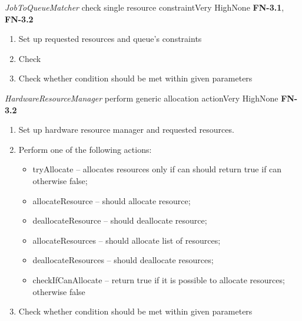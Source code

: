 \begin{testcase}{\emph{JobToQueueMatcher} check single resource constraint}{Very High}{None}
	{
		\textbf{FN-3.1}, \textbf{FN-3.2}
	}
	{
		\begin{enumerate}
			\item Set up requested resources and queue's constraints
			\item Check 
			\item Check whether condition should be met within given parameters
		\end{enumerate}
	}
\end{testcase}


\begin{testcase}{\emph{HardwareResourceManager} perform generic allocation action}{Very High}{None}
	{
		\textbf{FN-3.2}
	}
	{
		\begin{enumerate}
			\item Set up hardware resource manager and requested resources.
			\item
			{
				Perform one of the following actions: 
				\begin{itemize}
					\item tryAllocate -- allocates resources only if can should return true if can otherwise false;
					\item allocateResource -- should allocate resource;
					\item deallocateResource -- should deallocate resource;
					\item allocateResources -- should allocate list of resources;
					\item deallocateResources -- should deallocate resources;
					\item checkIfCanAllocate -- return true if it is possible to allocate resources; otherwise false
				\end{itemize}
			} 
			\item Check whether condition should be met within given parameters
		\end{enumerate}
	}
\end{testcase}

